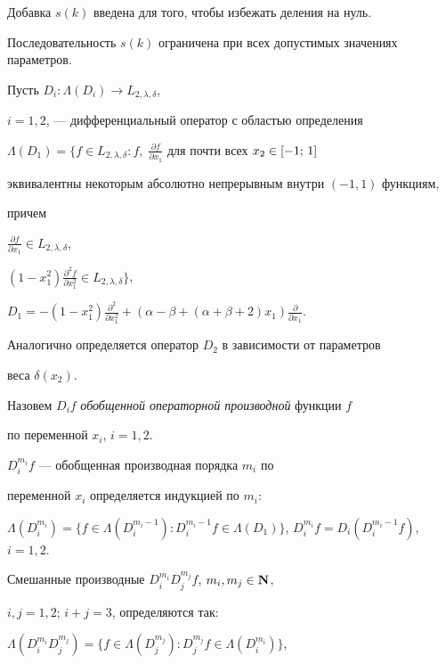 Добавка $s(k)$ введена для того, чтобы избежать деления на нуль.


Последовательность $s(k)$ ограничена при всех допустимых значениях параметров.


\medskip





Пусть $D_i:\Lambda(D_i)\longrightarrow L_{2, \lambda, \delta}$,


$i=1,2$, --- дифференциальный оператор с областью определения


$\Lambda(D_1)=\{f\in L_{2,\lambda,\delta}


:f,\;\frac{\partial f}{\partial x_1}$ для почти всех $x_2\in \ab$


эквивалентны некоторым абсолютно непрерывным внутри $(-1,1)$ функциям,


причем


$\frac{\partial f}{\partial x_1}\in L_{2,\lambda,\delta}$,


$(1-x_1^2)\frac{\partial^2f}{\partial x_1^2}\in


L_{2,\lambda,\delta}\}$,


$D_1 = -(1-x_1^2)\frac{\partial^2}{\partial x_1^2} +


(\alpha -\beta + (\alpha +\beta + 2)x_1)\frac{\partial}{\partial x_1}$.


Аналогично определяется оператор $D_2$ в зависимости от параметров


веса $\delta(x_2)$.





Назовем $D_if$ {\it обобщенной операторной производной} функции $f$


по переменной $x_i$, $i=1,2$.\;


$D_i^{m_i}f$ --- обобщенная производная порядка $m_i$ по


переменной $x_i$ определяется индукцией по $m_i$:


$\Lambda (D_i^{m_i})=\{f\in \Lambda (D_i^{m_i-1}):


D_i^{m_i-1}f\in \Lambda(D_1)\}$, $D_i^{m_i}f=


D_i (D_i^{m_i-1}f)$, $i=1,2$.


Смешанные производные $D_i^{m_i}D_j^{m_j}f$, $m_i,m_j\in {\bold N}$,


$i,j = 1,2$; $i+j = 3$, определяются так:


$\Lambda (D_i^{m_i}D_j^{m_j})=\{f\in \Lambda


(D_j^{m_j}):D_j^{m_j}f\in \Lambda (D_i^{m_i})\}$,


